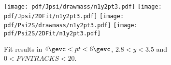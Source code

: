 \begin{figure}[H]
\begin{center}
\texttt{[image: pdf/Jpsi/drawmass/n1y2pt3.pdf]}
\texttt{[image: pdf/Jpsi/2DFit/n1y2pt3.pdf]}
\vspace*{-0.5cm}
\texttt{[image: pdf/Psi2S/drawmass/n1y2pt3.pdf]}
\texttt{[image: pdf/Psi2S/2DFit/n1y2pt3.pdf]}
\vspace*{-0.5cm}
\end{center}
\caption{Fit results in $4\gevc<pt<6\gevc$, $2.8<y<3.5$ and $0<PVNTRACKS<20$.}
\label{Fitn1y2pt3}
\end{figure}
